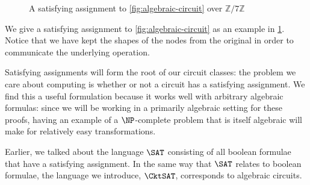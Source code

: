 \documentclass[english,12pt]{reedthesis}
\theoremstyle{plain}
\theoremstyle{definition}
\theoremstyle{remark}
\begin{document}
\begin{figure}
  \begin{center}
  \end{center}
  \caption{A satisfying assignment to \cref{fig:algebraic-circuit} over $\mathbb{Z}/7\mathbb{Z}$}\label{fig:sat-assignment}
\end{figure}

We give a satisfying assignment to \cref{fig:algebraic-circuit} as an example in
\cref{fig:sat-assignment}. Notice that we have kept the shapes of the nodes from
the original in order to communicate the underlying operation.

Satisfying assignments will form the root of our circuit classes: the problem we
care about computing is whether or not a circuit has a satisfying assignment.
We find this a useful formulation because it works well with arbitrary algebraic
formulas: since we will be working in a primarily algebraic setting for these
proofs, having an example of a $\NP$-complete problem that is itself algebraic
will make for relatively easy transformations.

Earlier, we talked about the language $\SAT$ consisting of all boolean formulae
that have a satisfying assignment. In the same way that $\SAT$ relates to
boolean formulae, the language we introduce, $\CktSAT$, corresponds to algebraic
circuits.
\end{document}
